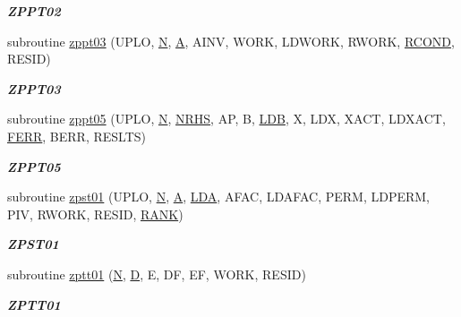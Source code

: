 \begin{DoxyCompactItemize}
\begin{DoxyCompactList}\small\item\em {\bfseries Z\+P\+P\+T02} \end{DoxyCompactList}\item 
subroutine \hyperlink{group__complex16__lin_ga69b469ebe060b5f171de2d992a31b755}{zppt03} (U\+P\+L\+O, \hyperlink{polmisc_8c_a0240ac851181b84ac374872dc5434ee4}{N}, \hyperlink{classA}{A}, A\+I\+N\+V, W\+O\+R\+K, L\+D\+W\+O\+R\+K, R\+W\+O\+R\+K, \hyperlink{superlu__enum__consts_8h_af00a42ecad444bbda75cde1b64bd7e72a9b5c151728d8512307565994c89919d5}{R\+C\+O\+N\+D}, R\+E\+S\+I\+D)
\begin{DoxyCompactList}\small\item\em {\bfseries Z\+P\+P\+T03} \end{DoxyCompactList}\item 
subroutine \hyperlink{group__complex16__lin_ga89c120dd2403691e2a312b552096f2aa}{zppt05} (U\+P\+L\+O, \hyperlink{polmisc_8c_a0240ac851181b84ac374872dc5434ee4}{N}, \hyperlink{example__user_8c_aa0138da002ce2a90360df2f521eb3198}{N\+R\+H\+S}, A\+P, B, \hyperlink{example__user_8c_a50e90a7104df172b5a89a06c47fcca04}{L\+D\+B}, X, L\+D\+X, X\+A\+C\+T, L\+D\+X\+A\+C\+T, \hyperlink{superlu__enum__consts_8h_af00a42ecad444bbda75cde1b64bd7e72a78fd14d7abebae04095cfbe02928f153}{F\+E\+R\+R}, B\+E\+R\+R, R\+E\+S\+L\+T\+S)
\begin{DoxyCompactList}\small\item\em {\bfseries Z\+P\+P\+T05} \end{DoxyCompactList}\item 
subroutine \hyperlink{group__complex16__lin_ga300ddc900d24cfb5370a648a85292d3a}{zpst01} (U\+P\+L\+O, \hyperlink{polmisc_8c_a0240ac851181b84ac374872dc5434ee4}{N}, \hyperlink{classA}{A}, \hyperlink{example__user_8c_ae946da542ce0db94dced19b2ecefd1aa}{L\+D\+A}, A\+F\+A\+C, L\+D\+A\+F\+A\+C, P\+E\+R\+M, L\+D\+P\+E\+R\+M, P\+I\+V, R\+W\+O\+R\+K, R\+E\+S\+I\+D, \hyperlink{splinemodule_8c_a3a88bcc63386de30443dacede2e01847}{R\+A\+N\+K})
\begin{DoxyCompactList}\small\item\em {\bfseries Z\+P\+S\+T01} \end{DoxyCompactList}\item 
subroutine \hyperlink{group__complex16__lin_ga66b4060d0db57474ba432cdcebbb8f27}{zptt01} (\hyperlink{polmisc_8c_a0240ac851181b84ac374872dc5434ee4}{N}, \hyperlink{odrpack_8h_a7dae6ea403d00f3687f24a874e67d139}{D}, E, D\+F, E\+F, W\+O\+R\+K, R\+E\+S\+I\+D)
\begin{DoxyCompactList}\small\item\em {\bfseries Z\+P\+T\+T01} \end{DoxyCompactList}\item 

\end{DoxyCompactItemize}
